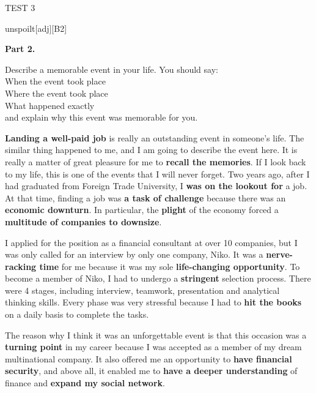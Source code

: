 \begin{glossarymc}[Cambridge 3]
\begin{test}{TEST 3}
\begin{VocabExplain}[Part 1]
\begin{ExplainCard}{unspoilt}[adj][B2]
\end{ExplainCard}


\end{VocabExplain}
\textbf{Part 2.}

\begin{qa}{Describe a memorable event in your life. You should say: 
\\ When the event took place 
\\ Where the event took place 
\\ What happened exactly 
\\ and explain why this event was memorable for you.}

\textbf{Landing a well-paid job} is really an outstanding event in someone's life. The similar thing happened to me, and I am going to describe the event here. It is really a matter of great pleasure for me to \textbf{recall the memories}. If I look back to my life, this is one of the events that I will never forget. Two years ago, after I had graduated from Foreign Trade University, I \textbf{was on the lookout for} a job. At that time, finding a job was \textbf{a task of challenge} because there was an \textbf{economic downturn}. In particular, the \textbf{plight} of the economy forced a \textbf{multitude of companies to downsize}. 

I applied for the position as a financial consultant at over 10 companies, but I was only called for an interview by only one company, Niko. It was a \textbf{nerve-racking time} for me because it was my sole \textbf{life-changing opportunity}. To become a member of Niko, I had to undergo a \textbf{stringent} selection process. There were 4 stages, including interview, teamwork, presentation and analytical thinking skills. Every phase was very stressful because I had to \textbf{hit the books} on a daily basis to complete the tasks. 

The reason why I think it was an unforgettable event is that this occasion was a \textbf{turning point} in my career because I was accepted as a member of my dream multinational company. It also offered me an opportunity to \textbf{have financial security}, and above all, it enabled me to \textbf{have a deeper understanding} of finance and \textbf{expand my social network}.
\end{qa}



\end{test}
\end{glossarymc}
